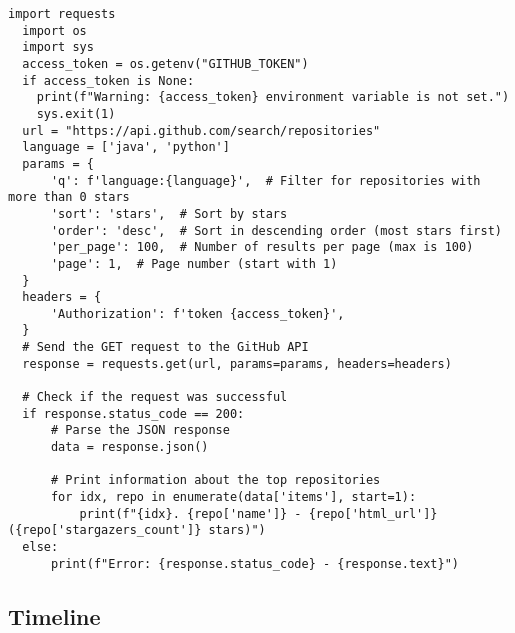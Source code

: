 \begin{lstlisting}[style=mystyle, caption={Fetch Top 100 Java and Python Repositories}, label=pythoncode]
  import requests
  import os
  import sys
  access_token = os.getenv("GITHUB_TOKEN")
  if access_token is None:
    print(f"Warning: {access_token} environment variable is not set.")
    sys.exit(1)    
  url = "https://api.github.com/search/repositories"  
  language = ['java', 'python']
  params = {
      'q': f'language:{language}',  # Filter for repositories with more than 0 stars
      'sort': 'stars',  # Sort by stars
      'order': 'desc',  # Sort in descending order (most stars first)
      'per_page': 100,  # Number of results per page (max is 100)
      'page': 1,  # Page number (start with 1)
  }
  headers = {
      'Authorization': f'token {access_token}',
  }
  # Send the GET request to the GitHub API
  response = requests.get(url, params=params, headers=headers)

  # Check if the request was successful
  if response.status_code == 200:
      # Parse the JSON response
      data = response.json()

      # Print information about the top repositories
      for idx, repo in enumerate(data['items'], start=1):
          print(f"{idx}. {repo['name']} - {repo['html_url']} ({repo['stargazers_count']} stars)")
  else:
      print(f"Error: {response.status_code} - {response.text}")
\end{lstlisting}

\subsection{Timeline}



